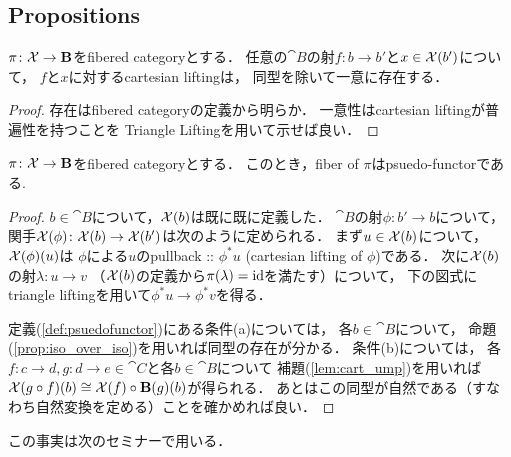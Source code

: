 \subsection{Propositions}
\begin{Lemma} \label{lem:cart_ump}
    $\pi \colon \mathcal{X} \to \mathbf{B}$をfibered categoryとする．
    任意の$\cat{B}$の射$f \colon b \to b'$と$x \in \mathcal{X}(b')$について，
    $f$と$x$に対するcartesian liftingは，
    同型を除いて一意に存在する．
\end{Lemma}
\begin{proof}
    存在はfibered categoryの定義から明らか．
    一意性はcartesian liftingが普遍性を持つことを
    Triangle Liftingを用いて示せば良い．
\end{proof}

\begin{Lemma}
    $\pi \colon \mathcal{X} \to \mathbf{B}$をfibered categoryとする．
    このとき，fiber of $\pi$はpsuedo-functorである.
\end{Lemma}
\begin{proof}
    $b \in \cat{B}$について，$\mathcal{X}(b)$は既に既に定義した．
    $\cat{B}$の射$\phi \colon b' \to b$について，
    関手$\mathcal{X}(\phi) \colon \mathcal{X}(b) \to \mathcal{X}(b')$は次のように定められる．
    まず$u \in \mathcal{X}(b)$について，
    $\mathcal{X}(\phi)(u)$は
    $\phi$による$u$のpullback :: $\phi^* u$ (cartesian lifting of $\phi$)である．
    次に$\mathcal{X}(b)$の射$\lambda \colon u \to v$
    （$\mathcal{X}(b)$の定義から$\pi(\lambda)=\mathrm{id}_{\!}$を満たす）について，
    下の図式にtriangle liftingを用いて$\phi^*u \to \phi^*v$を得る．
    \begin{center}
    \end{center}

    定義(\ref{def:psuedofunctor})にある条件(a)については，
    各$b \in \cat{B}$について，
    命題(\ref{prop:iso_over_iso})を用いれば同型の存在が分かる．
    条件(b)については，
    各$f \colon c \to d, g \colon d \to e \in \cat{C}$と各$b \in \cat{B}$について
    補題(\ref{lem:cart_ump})を用いれば
    $\mathcal{X}(g \circ f)(b) \cong \mathcal{X}(f) \circ \mathbf{B}(g)(b)$が得られる．
    あとはこの同型が自然である（すなわち自然変換を定める）ことを確かめれば良い．
\end{proof}
この事実は次のセミナーで用いる．

